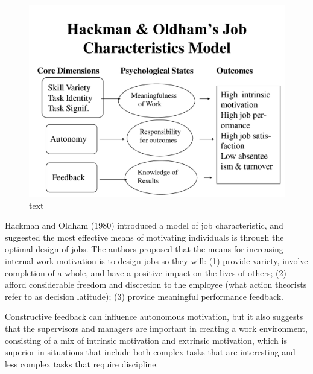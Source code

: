 \begin{figure}
\centering
\includegraphics[width=\textwidth]{Grafik/Hackman}
\caption{text}
\label{Hackman}
\end{figure}

Hackman and Oldham (1980) introduced a model of job characteristic, and suggested the most effective means of motivating individuals is through the optimal design of jobs.
The authors proposed that the means for increasing internal work motivation is to design jobs so they will:
(1) provide variety, involve completion of a whole, and have a positive impact on the lives of others;
(2) afford considerable freedom and discretion to the employee (what action theorists refer to as decision latitude); 
(3) provide meaningful performance feedback.

Constructive feedback can influence autonomous motivation, but it also suggests that the supervisors and managers are important in creating a work environment, consisting of a mix of intrinsic motivation and extrinsic motivation, which is superior in situations that include both complex tasks that are interesting and less complex tasks that require discipline. 
